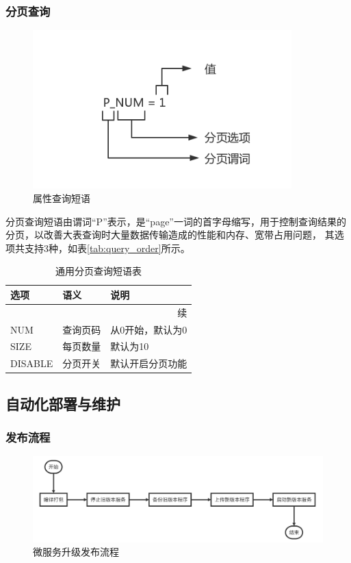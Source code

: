 \documentclass[titlepage,UTF8,linespread=1.5]{ctexart}
\begin{document}
\subsubsection{分页查询}
\begin{figure}[H]
    \centering
    \includegraphics[width=100mm]{query_page.png}
    \caption{属性查询短语}
    \label{fig:query_page}
\end{figure}
分页查询短语由谓词“P”表示，是“page”一词的首字母缩写，用于控制查询结果的分页，以改善大表查询时大量数据传输造成的性能和内存、宽带占用问题，
其选项共支持3种，如表\ref{tab:query_order}所示。
\begin{longtable}{|p{10em}|p{6em}|p{15em}|}
	\caption{通用分页查询短语表}\label{tab:query_page} \\\hline
	选项    & 语义     & 说明                          \\\hline
	\endfirsthead
	\multicolumn{3}{r}{{续\tablename\thetable{}}}      \\\hline
	\endhead
	NUM     & 查询页码 & 从0开始，默认为0              \\\hline
	SIZE    & 每页数量 & 默认为10                      \\\hline
	DISABLE & 分页开关 & 默认开启分页功能              \\\hline
\end{longtable}\par

\subsection{自动化部署与维护}
\subsubsection{发布流程}
\begin{figure}[H]
    \centering
    \includegraphics[width=150mm]{flow-deploy.png}
    \caption{微服务升级发布流程}
    \label{fig:flow-deploy}
\end{figure}
\end{document}
